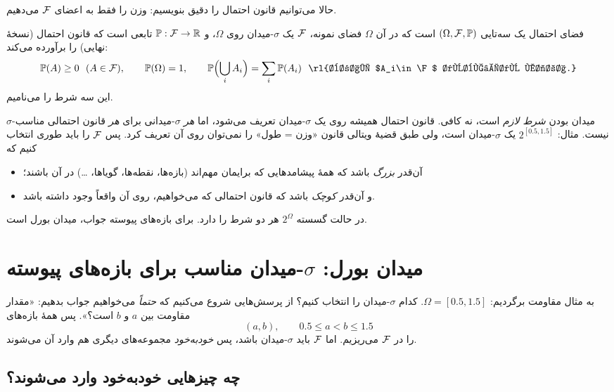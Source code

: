 حالا می‌توانیم قانون احتمال را دقیق بنویسیم: وزن را فقط به اعضای $\mathcal{F}$ می‌دهیم.

\begin{definition}[label=def:prob-space]{فضای احتمال}
 یک سه‌تایی $(\Omega,\mathcal{F},\mathbb{P})$ است که در آن $\Omega$ فضای نمونه، $\mathcal{F}$ یک $\sigma$-میدان روی $\Omega$، و $\mathbb{P}:\mathcal{F}\to\mathbb{R}$ تابعی است که قانون احتمال (نسخهٔ نهایی) را برآورده می‌کند:
\[ \P(A)\ge0\ \ (A\in\F),\qquad \P(\Omega)=1,\qquad \P\Bigl(\bigcup_{i}A_i\Bigr)=\sum_{i}\P(A_i)\ \ \text{\rl{برای $A_i\in\F$ دوبه‌دو مجزا.}} \]
این سه شرط را  می‌نامیم.
\end{definition}

\begin{warning}
$\sigma$-میدان بودن \emph{شرط لازم} است، نه کافی. قانون احتمال همیشه روی یک $\sigma$-میدان تعریف می‌شود، اما \emph{هر} $\sigma$-میدانی برای \emph{هر} قانون احتمالی مناسب نیست. مثال: $2^{[0.5,1.5]}$ یک $\sigma$-میدان است، ولی طبق قضیهٔ ویتالی قانون «وزن = طول» را نمی‌توان روی آن تعریف کرد. پس $\mathcal{F}$ را باید طوری انتخاب کنیم که
\begin{itemize}
  \item آن‌قدر \emph{بزرگ} باشد که همهٔ پیشامدهایی که برایمان مهم‌اند (بازه‌ها، نقطه‌ها، گویاها، \dots) در آن باشند؛
  \item و آن‌قدر \emph{کوچک} باشد که قانون احتمالی که می‌خواهیم، روی آن واقعاً وجود داشته باشد.
\end{itemize}
در حالت گسسته $2^\Omega$ هر دو شرط را دارد. برای بازه‌های پیوسته جواب، میدان بورل است.
\end{warning}

\section{میدان بورل: $\sigma$-میدان مناسب برای بازه‌های پیوسته}

به مثال مقاومت برگردیم: $\Omega=[0.5,1.5]$. کدام $\sigma$-میدان را انتخاب کنیم؟ از پرسش‌هایی شروع می‌کنیم که \emph{حتماً} می‌خواهیم جواب بدهیم: «مقدار مقاومت بین $a$ و $b$ است؟». پس همهٔ بازه‌های
\[ (a,b),\qquad 0.5\le a<b\le1.5 \]
را در $\mathcal{F}$ می‌ریزیم. اما $\mathcal{F}$ باید $\sigma$-میدان باشد، پس \emph{خودبه‌خود} مجموعه‌های دیگری هم وارد آن می‌شوند.

\subsection{چه چیزهایی خودبه‌خود وارد می‌شوند؟}

